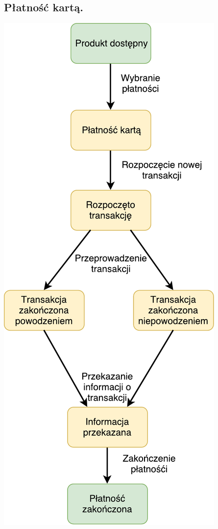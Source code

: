 \documentclass[11pt]{article}
\begin{document}
		\subsection{Płatność kartą.}
		\begin{center}
			\includegraphics[scale=0.75]{stanu2.pdf}
		\end{center}
\end{document}
